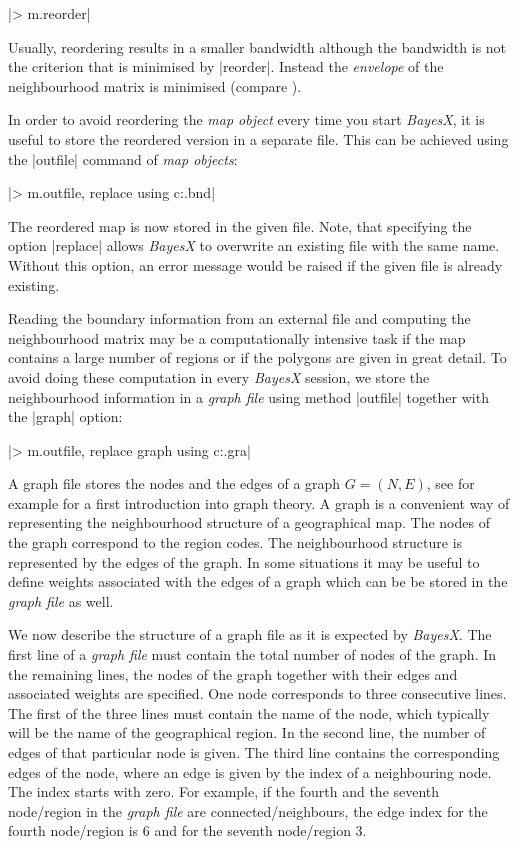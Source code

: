 |> m.reorder|

Usually, reordering results in a smaller bandwidth although the bandwidth is not the criterion that is minimised by |reorder|.
Instead the {\it envelope} of the neighbourhood matrix is minimised (compare ).

In order to avoid reordering the {\it map object} every time you start {\it BayesX}, it is useful to store the reordered
version in a separate file. This can be achieved using the |outfile| command of {\it map objects}:

|> m.outfile, replace using c:\data\zambiasort.bnd|

The reordered map is now stored in the given file. Note, that specifying the option |replace| allows {\it BayesX} to overwrite
an existing file with the same name. Without this option, an error message would be raised if the given file is already
existing.

Reading the boundary information from an external file and computing the neighbourhood matrix may be a computationally
intensive task if the map contains a large number of regions or if the polygons are given in great detail. To avoid doing these
computation in every {\it BayesX} session, we store the neighbourhood information in a {\it graph file} using method |outfile|
together with the |graph| option:

|> m.outfile, replace graph using c:\data\zambiasort.gra|

A graph file stores the nodes and the edges of a graph $G = (N,E)$, see for example  for a first
introduction into graph theory. A graph is a convenient way of representing the neighbourhood structure of a geographical map.
The nodes of the graph correspond to the region codes. The neighbourhood structure is represented by the edges of the graph. In
some situations it may be useful to define weights associated with the edges of a graph which can be be stored in the {\it
graph file} as well.

We now describe the structure of a graph file as it is expected by {\it BayesX}. The first line of a {\it graph file} must
contain the total number of nodes of the graph. In the remaining lines, the nodes of the graph together with their edges and
associated weights are specified. One node corresponds to three consecutive lines. The first of the three lines must contain
the name of the node, which typically will be the name of the geographical region. In the second line, the number of edges of
that particular node is given. The third line contains the corresponding edges of the node, where an edge is given by the index
of a neighbouring node. The index starts with zero. For example, if the fourth and the seventh node/region in the {\it graph
file} are connected/neighbours, the edge index for the fourth node/region is 6 and for the seventh node/region 3.

